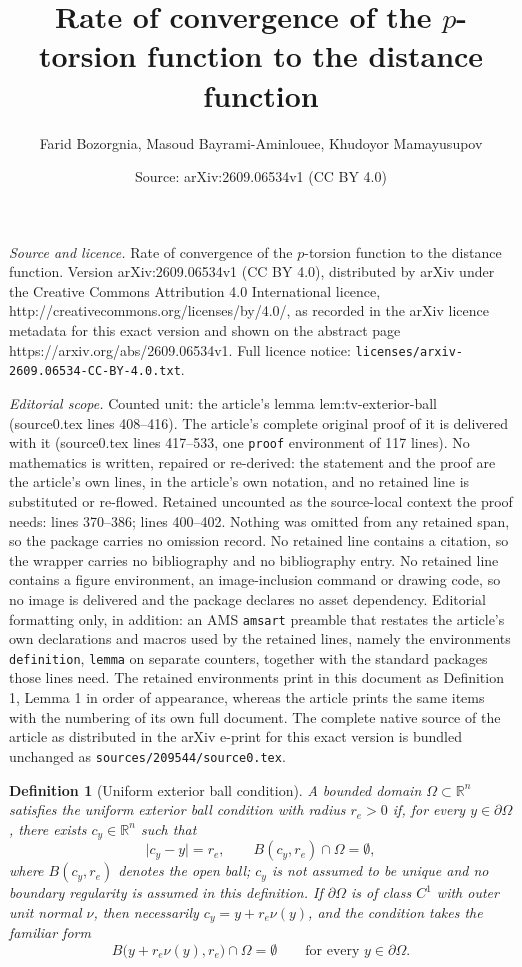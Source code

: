 \documentclass[10pt,a4paper]{amsart}
\title{Rate of convergence of the $p$-torsion function to the distance function}
\author{Farid Bozorgnia, Masoud Bayrami-Aminlouee, Khudoyor Mamayusupov}
\date{Source: arXiv:2609.06534v1 (CC BY 4.0)}
\newtheorem{definition}{Definition}
\newcommand{\R}{\mathbb R}
\newcommand{\abs}[1]{\lvert #1\rvert}
\begin{document}
\maketitle

\noindent\emph{Source and licence.} Rate of convergence of the $p$-torsion function to the distance function. Version arXiv:2609.06534v1 (CC BY 4.0), distributed by arXiv under the Creative Commons Attribution 4.0 International licence, http://creativecommons.org/licenses/by/4.0/, as recorded in the arXiv licence metadata for this exact version and shown on the abstract page https://arxiv.org/abs/2609.06534v1. Full licence notice: \texttt{licenses/arxiv-2609.06534-CC-BY-4.0.txt}.\par\smallskip

\noindent\textit{Editorial scope.} Counted unit: the article's lemma lem:tv-exterior-ball (source0.tex lines 408--416). The article's complete original proof of it is delivered with it (source0.tex lines 417--533, one \texttt{proof} environment of 117 lines). No mathematics is written, repaired or re-derived: the statement and the proof are the article's own lines, in the article's own notation, and no retained line is substituted or re-flowed.  Retained uncounted as the source-local context the proof needs: lines 370--386; lines 400--402.  Nothing was omitted from any retained span, so the package carries no omission record.  No retained line contains a citation, so the wrapper carries no bibliography and no bibliography entry.  No retained line contains a figure environment, an image-inclusion command or drawing code, so no image is delivered and the package declares no asset dependency.  Editorial formatting only, in addition: an AMS \texttt{amsart} preamble that restates the article's own declarations and macros used by the retained lines, namely the environments \texttt{definition}, \texttt{lemma} on separate counters, together with the standard packages those lines need.  The retained environments print in this document as Definition 1, Lemma 1 in order of appearance, whereas the article prints the same items with the numbering of its own full document.  The complete native source of the article as distributed in the arXiv e-print for this exact version is bundled unchanged as \texttt{sources/209544/source0.tex}.
\begin{definition}[Uniform exterior ball condition]\label{def:ext-ball}
A bounded domain $\Omega\subset\R^n$ satisfies the \emph{uniform exterior ball
condition with radius $r_e>0$} if, for every $y\in\partial\Omega$, there
exists $c_y\in\R^n$ such that
\[
\abs{c_y-y}=r_e,
\qquad B(c_y,r_e)\cap\Omega=\emptyset,
\]
where $B(c_y,r_e)$ denotes the open ball; $c_y$ is not assumed to be unique
and no boundary regularity is assumed in this definition. If
$\partial\Omega$ is of class $C^1$ with outer unit normal $\nu$, then
necessarily $c_y=y+r_e\nu(y)$, and the condition takes the familiar form
\begin{equation}\label{eq:ext-ball}
B\bigl(y+r_e\nu(y),r_e\bigr)\cap\Omega=\emptyset
\qquad\text{for every }y\in\partial\Omega .
\end{equation}
\end{definition}
\end{document}
